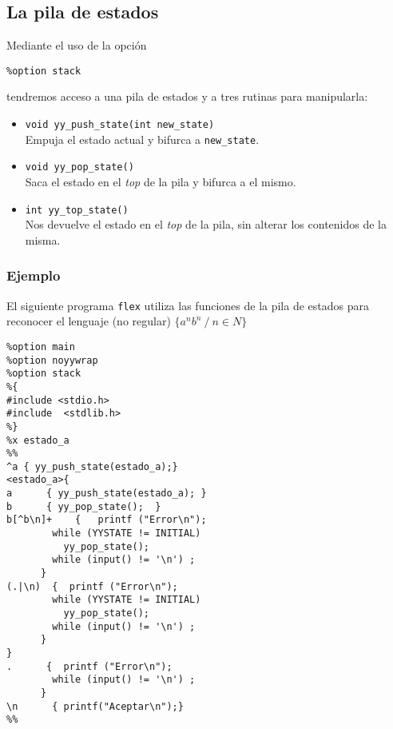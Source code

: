 \subsection{La pila de estados}
Mediante el uso de la opción

\verb|%option stack|

\noindent tendremos acceso a una pila de estados y a tres rutinas para  manipularla:\\
\begin{itemize}
\item
\verb|void yy_push_state(int new_state)|\\
Empuja el estado actual y bifurca a \verb|new_state|.\\
\item
\verb|void yy_pop_state()|\\
Saca el estado en el \emph{top} de la pila y bifurca a el mismo.\\
\item
\verb|int yy_top_state()|\\
Nos devuelve el estado en el \emph{top} de la pila, sin alterar
los contenidos de la misma.
\end{itemize}

\subsubsection{Ejemplo}
El siguiente programa \verb|flex| utiliza las funciones de la pila
de estados para reconocer el lenguaje (no regular) 
$\{a^n b^n\ /\ n \in N\}$

\begin{verbatim}
%option main
%option noyywrap
%option stack
%{
#include <stdio.h>
#include  <stdlib.h>
%}
%x estado_a
%%
^a { yy_push_state(estado_a);}
<estado_a>{
a      { yy_push_state(estado_a); }
b      { yy_pop_state();  }
b[^b\n]+    {   printf ("Error\n"); 
        while (YYSTATE != INITIAL)
          yy_pop_state();
        while (input() != '\n') ;
      }
(.|\n)  {  printf ("Error\n"); 
        while (YYSTATE != INITIAL)
          yy_pop_state();
        while (input() != '\n') ;
      }
}
.      {  printf ("Error\n");
        while (input() != '\n') ;
      }
\n      { printf("Aceptar\n");}
%%
\end{verbatim}

